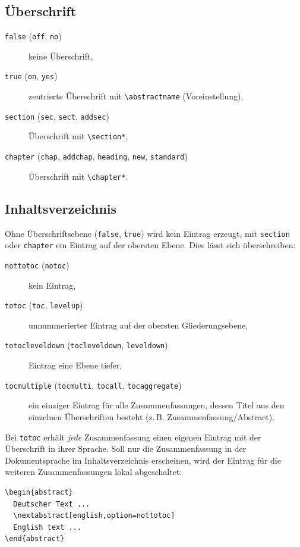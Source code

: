 \documentclass[
  logo={
    color=blue,
    language=de,
    colormodel=rgb
  },
  fontsize=11tudpt,
  usemargin,
  oneside
]{tudcdreprt}
\begin{document}
\subsection{Überschrift}
\begin{description}
  \item[\texttt{false} (\texttt{off}, \texttt{no})] keine Überschrift,
  \item[\texttt{true} (\texttt{on}, \texttt{yes})] zentrierte Überschrift mit \texttt{\textbackslash abstractname}
    (Voreinstellung),
  \item[\texttt{section} (\texttt{sec}, \texttt{sect}, \texttt{addsec})] Überschrift mit \texttt{\textbackslash section*},
  \item[\texttt{chapter} (\texttt{chap}, \texttt{addchap}, \texttt{heading}, \texttt{new}, \texttt{standard})]
    Überschrift mit \texttt{\textbackslash chapter*}.
\end{description}

\subsection{Inhaltsverzeichnis}
Ohne Überschriftsebene (\texttt{false}, \texttt{true}) wird kein Eintrag erzeugt, mit \texttt{section} oder
\texttt{chapter} ein Eintrag auf der obersten Ebene. Dies lässt sich überschreiben:
\begin{description}
  \item[\texttt{nottotoc} (\texttt{notoc})] kein Eintrag,
  \item[\texttt{totoc} (\texttt{toc}, \texttt{levelup})] unnummerierter Eintrag auf der obersten Gliederungsebene,
  \item[\texttt{totocleveldown} (\texttt{tocleveldown}, \texttt{leveldown})] Eintrag eine Ebene tiefer,
  \item[\texttt{tocmultiple} (\texttt{tocmulti}, \texttt{tocall}, \texttt{tocaggregate})] ein einziger Eintrag
    für alle Zusammenfassungen, dessen Titel aus den einzelnen Überschriften besteht
    (z.\,B. \glqq Zusammenfassung/Abstract\grqq).
\end{description}
Bei \texttt{totoc} erhält \emph{jede} Zusammenfassung einen eigenen Eintrag mit der Überschrift in ihrer Sprache.
Soll nur die Zusammenfassung in der Dokumentsprache im Inhaltsverzeichnis erscheinen, wird der Eintrag für die
weiteren Zusammenfassungen lokal abgeschaltet:
\begin{lstlisting}
\begin{abstract}
  Deutscher Text ...
  \nextabstract[english,option=nottotoc]
  English text ...
\end{abstract}
\end{lstlisting}
\end{document}
